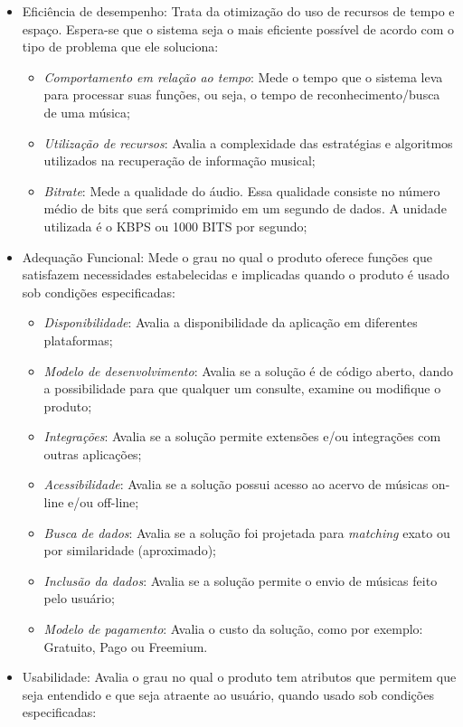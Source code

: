 \begin{itemize}
    \item Eficiência de desempenho: Trata da otimização do uso de recursos de tempo e espaço. Espera-se que o sistema seja o mais eficiente possível de acordo com o tipo de problema que ele soluciona:
    \begin{itemize}
        \item \textit{Comportamento em relação ao tempo}: Mede o tempo que o sistema leva para processar suas funções, ou seja, o tempo de reconhecimento/busca de uma música;
        \item \textit{Utilização de recursos}: Avalia a complexidade das estratégias e algoritmos utilizados na recuperação de informação musical;
        \item \textit{Bitrate}: Mede a qualidade do áudio. Essa qualidade consiste no número médio de bits que será comprimido em um segundo de dados. A unidade utilizada é o KBPS ou 1000 BITS por segundo;
    \end{itemize}
    \item Adequação Funcional: Mede o grau no qual o produto oferece funções que satisfazem necessidades estabelecidas e implicadas quando o produto é usado sob condições especificadas:
    \begin{itemize}
        \item \textit{Disponibilidade}: Avalia a disponibilidade da aplicação em diferentes plataformas;
        \item \textit{Modelo de desenvolvimento}: Avalia se a solução é de código aberto, dando a possibilidade para que qualquer um consulte, examine ou modifique o produto;
        \item \textit{Integrações}: Avalia se a solução permite extensões e/ou integrações com outras aplicações;
        \item \textit{Acessibilidade}: Avalia se a solução possui acesso ao acervo de músicas on-line e/ou off-line;
        \item \textit{Busca de dados}: Avalia se a solução foi projetada para \textit{matching} exato ou por similaridade (aproximado);
        \item \textit{Inclusão da dados}: Avalia se a solução permite o envio de músicas feito pelo usuário;
        \item \textit{Modelo de pagamento}: Avalia o custo da solução, como por exemplo: Gratuito, Pago ou Freemium.
    \end{itemize}
    \item Usabilidade: Avalia o grau no qual o produto tem atributos que permitem que seja entendido e que seja atraente ao usuário, quando usado sob condições especificadas:

\end{itemize}
